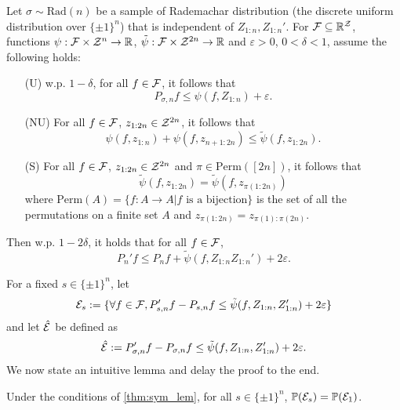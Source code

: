 \documentclass[twoside]{article}
\begin{document}
\begin{theorem}\label{thm:sym_lem}
   Let $\sigma\sim \mathrm{Rad}(n)$ be a sample of Rademachar distribution (the discrete uniform distribution over $\{\pm 1\}^n$) that is independent of $Z_{1:n}, Z_{1:n}'$. For $\mathcal{F}\subseteq \mathbb{R}^{\mathcal{Z}}$, functions $\psi:\mathcal{F}\times \mathcal{Z}^n\to \mathbb{R}$, $\tilde \psi:\mathcal{F}\times \mathcal{Z}^{2n}\to\mathbb{R}$ and $\varepsilon>0$, $0<\delta<1$, assume the following holds:
   \begin{enumerate}
      \item[(U)] w.p. $1-\delta$, for all $f\in \mathcal{F}$, it follows that \[P_{\sigma,n}f\le \psi(f,Z_{1:n})+\varepsilon.\]
      \item[(NU)] For all $f\in \mathcal{F}$, $z_{1:2n}\in \mathcal{Z}^{2n}$, it follows that \[\psi(f,z_{1:n})+\psi(f,z_{n+1:2n})\le \tilde\psi(f,z_{1:2n}).\]
      \item[(S)] For all $f\in \mathcal{F}$, $z_{1:2n}\in \mathcal{Z}^{2n}$ and $\pi\in \mathrm{Perm}([2n])$, it follows that
      \[\tilde \psi(f,z_{1:2n})=\tilde \psi(f,z_{\pi(1:2n)})\]
      where $\mathrm{Perm}(A)=\{f:A\to A\vert f \text{ is a bijection}\}$ is the set of all the permutations on a finite set $A$ and $z_{\pi(1:2n)}=z_{\pi(1):\pi(2n)}$.
   \end{enumerate}
   Then w.p. $1-2\delta$, it holds that for all $f\in \mathcal{F}$,
   \begin{equation*}
      P_n'f\le P_nf+\tilde\psi(f,Z_{1:n}Z_{1:n}')+2\varepsilon.
   \end{equation*}
\end{theorem}
For a fixed $s\in \{\pm 1\}^n$, let \[\mathcal{E}_s:=\{\forall f\in \mathcal{F}, P_{s,n}'f-P_{s,n}f\le \tilde\psi(f,Z_{1:n}, Z_{1:n}')+2\varepsilon\}\] and let $\hat {\mathcal{E}}$ be defined as \begin{equation}
   {\hat{\mathcal{E}}}:={P'_{\sigma,n}f-P_{\sigma,n}f\le \tilde \psi(f,Z_{1:n},Z_{1:n}')+2\varepsilon}\label{eq:ehat}.
\end{equation} We now state an intuitive lemma and delay the proof to the end.
\begin{lemma}
   Under the conditions of \cref{thm:sym_lem}, for all $s\in \{\pm 1\}^n$, $\mathbb{P}(\mathcal{E}_s)=\mathbb{P}(\mathcal{E}_1)$.\label{lem:helper}
\end{lemma}
\end{document}
